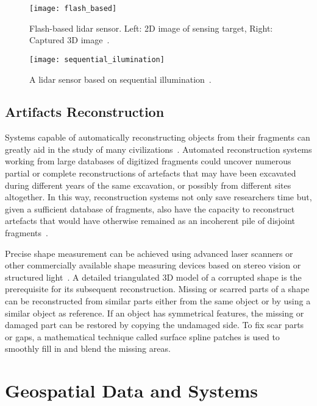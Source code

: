 \begin{figure}[h!]
    \centering
    \texttt{[image: flash\_based]}
    \caption{Flash-based \gls{lidar} sensor. \small{Left: \gls{2D} image of sensing target, Right: Captured \gls{3D} image}~\cite{li2022progress}.}
    \label{fig:flash_based}
\end{figure} 

\begin{figure}[h!]
    \centering
    \texttt{[image: sequential\_ilumination]}
    \caption{A \gls{lidar} sensor based on sequential illumination~\cite{li2022progress}.}
    \label{fig:sequential_ilumination}
\end{figure} 

\FloatBarrier

\subsection{Artifacts Reconstruction}
\label{sec:reconstruction}

Systems capable of automatically reconstructing objects from their fragments can greatly aid in the study of many civilizations~\cite{willis2008computational}.
Automated reconstruction systems working from large databases of digitized fragments could uncover numerous partial or
complete reconstructions of artefacts that may have been excavated during different years of the same excavation, or possibly
from different sites altogether. In this way, reconstruction systems not only save researchers time but, given a sufficient database 
of fragments, also have the capacity to reconstruct artefacts that would have otherwise remained as an incoherent pile of disjoint fragments~.

Precise shape measurement can be achieved using advanced laser scanners or other commercially available shape measuring devices based on stereo 
vision or structured light~\cite{7801178}. A detailed triangulated \gls{3D} model of a corrupted shape is the prerequisite for its subsequent reconstruction. 
Missing or scarred parts of a shape can be reconstructed from similar parts either from the same
object or by using a similar object as reference. If an object has symmetrical features, the missing or damaged part can be restored by copying the undamaged side.
To fix scar parts or gaps, a mathematical technique called surface spline patches is used to smoothly fill in and blend the missing areas.

\section{Geospatial Data and Systems}
\label{sec:geographic_information_system}

